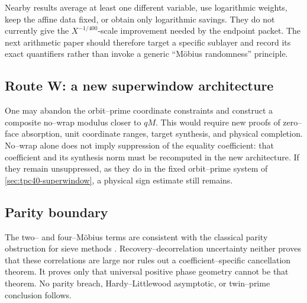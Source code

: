 Nearby results average at least one different variable, use logarithmic
weights, keep the affine data fixed, or obtain only logarithmic savings.
They do not currently give the \(X^{-1/400}\)-scale improvement needed by
the endpoint packet.  The next arithmetic paper should therefore target a
specific sublayer and record its exact quantifiers rather than invoke a
generic ``M\"obius randomness'' principle.

\subsection{Route W: a new superwindow architecture}

One may abandon the orbit--prime coordinate constraints and construct a
composite no--wrap modulus closer to \(qM\).  This would require new
proofs of zero--face absorption, unit coordinate ranges, target synthesis,
and physical completion.  No--wrap alone does not imply suppression of the
equality coefficient: that coefficient and its synthesis norm must be
recomputed in the new architecture.  If they remain unsuppressed, as they
do in the fixed orbit--prime system of
\cref{sec:tpc40-superwindow}, a physical sign estimate still remains.

\subsection{Parity boundary}

The two-- and four--M\"obius terms are consistent with the classical
parity obstruction for sieve methods
\citep{HeathBrown1982Parity,IwaniecKowalski2004}.  Recovery--decorrelation
uncertainty neither proves that these correlations are large nor rules out
a coefficient--specific cancellation theorem.  It proves only that
universal positive phase geometry cannot be that theorem.  No parity
breach, Hardy--Littlewood asymptotic, or twin--prime conclusion follows.
